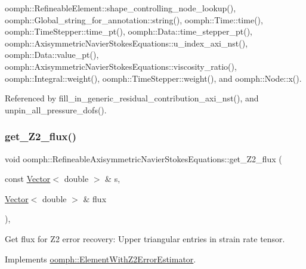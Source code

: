 oomph\+::\+Refineable\+Element\+::shape\+\_\+controlling\+\_\+node\+\_\+lookup(), oomph\+::\+Global\+\_\+string\+\_\+for\+\_\+annotation\+::string(), oomph\+::\+Time\+::time(), oomph\+::\+Time\+Stepper\+::time\+\_\+pt(), oomph\+::\+Data\+::time\+\_\+stepper\+\_\+pt(), oomph\+::\+Axisymmetric\+Navier\+Stokes\+Equations\+::u\+\_\+index\+\_\+axi\+\_\+nst(), oomph\+::\+Data\+::value\+\_\+pt(), oomph\+::\+Axisymmetric\+Navier\+Stokes\+Equations\+::viscosity\+\_\+ratio(), oomph\+::\+Integral\+::weight(), oomph\+::\+Time\+Stepper\+::weight(), and oomph\+::\+Node\+::x().



Referenced by fill\+\_\+in\+\_\+generic\+\_\+residual\+\_\+contribution\+\_\+axi\+\_\+nst(), and unpin\+\_\+all\+\_\+pressure\+\_\+dofs().

\mbox{\label{classoomph_1_1RefineableAxisymmetricNavierStokesEquations_ad4db711b6d0357a3b008624d68b3b1ba}} 
\subsubsection{\texorpdfstring{get\+\_\+\+Z2\+\_\+flux()}{get\_Z2\_flux()}}
{\footnotesize\ttfamily void oomph\+::\+Refineable\+Axisymmetric\+Navier\+Stokes\+Equations\+::get\+\_\+\+Z2\+\_\+flux (\begin{DoxyParamCaption}\item[{const \hyperlink{classoomph_1_1Vector}{Vector}$<$ double $>$ \&}]{s,  }\item[{\hyperlink{classoomph_1_1Vector}{Vector}$<$ double $>$ \&}]{flux }\end{DoxyParamCaption})\hspace{0.3cm}{\ttfamily [inline]}, {\ttfamily [virtual]}}



Get \textquotesingle{}flux\textquotesingle{} for Z2 error recovery\+: Upper triangular entries in strain rate tensor. 



Implements \hyperlink{classoomph_1_1ElementWithZ2ErrorEstimator_a5688ff5f546d81771cabad82ca5a7556}{oomph\+::\+Element\+With\+Z2\+Error\+Estimator}.



